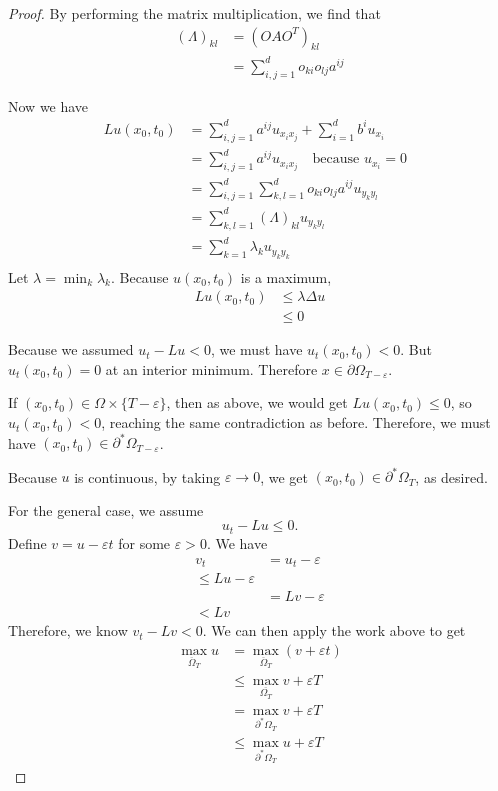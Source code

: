 \documentclass[a4paper]{article}
\begin{document}
\begin{enumerate}
\begin{proof}
     By performing the matrix multiplication, we find that
     \begin{align*}
       (\Lambda)_{kl} &= (OAO^T)_{kl} \\
       &= \sum_{i,j=1}^d o_{ki} o_{lj} a^{ij}
     \end{align*}

     Now we have
     \begin{align*}
       Lu(x_0,t_0) &= \sum_{i,j=1}^d a^{ij} u_{x_i x_j} + \sum_{i=1}^d b^i u_{x_i} \\
       &= \sum_{i,j=1}^d a^{ij} u_{x_i x_j} \quad \text{because $u_{x_i}=0$ } \\
       &= \sum_{i,j=1}^d \sum_{k,l=1}^d o_{ki} o_{lj} a^{ij} u_{y_k y_l} \\
       &= \sum_{k,l=1}^d (\Lambda)_{kl} u_{y_k y_l} \\
       &= \sum_{k=1}^d \lambda_k u_{y_k y_k} \\
     \end{align*}
    Let $\lambda = \min_{k} \lambda_k$.
    Because $u(x_0,t_0)$ is a maximum,
    \begin{align*}
      Lu(x_0,t_0) &\leq \lambda \Delta u \\
      &\leq 0
    \end{align*}

    Because we assumed $u_t - Lu < 0$, we must have $u_t(x_0, t_0) < 0$. But $u_t(x_0,t_0) = 0$ at an interior minimum. Therefore $x \in
    \partial \Omega_{T-\varepsilon}$.

    If $(x_0, t_0) \in \Omega \times \{T-\varepsilon\}$, then as above, we would get $Lu(x_0,t_0) \leq 0$, so $u_t(x_0, t_0) < 0$, reaching the same
    contradiction as before.
    Therefore, we must have $(x_0,t_0) \in \partial^\ast \Omega_{T-\varepsilon}$.

    Because $u$ is continuous, by taking $\varepsilon \to 0$, we get $(x_0, t_0) \in \partial^\ast \Omega_T$, as desired.

    For the general case, we assume
    \[ u_t - Lu \leq 0 .\]
    Define $v = u - \varepsilon t$ for some $\varepsilon >0$. We have
    \begin{align*}
      v_t &= u_t - \varepsilon \\
      \leq Lu - \varepsilon \\
      &= Lv - \varepsilon \\
      < Lv
    \end{align*}
    Therefore, we know $v_t - Lv < 0$. We can then apply the work above to get
    \begin{align*}
      \max_{ \overline{\Omega}_T } u &= \max_{ \overline{\Omega}_T } (v + \varepsilon t) \\
      &\leq \max_{ \overline{\Omega_T} } v + \varepsilon T \\
      &= \max_{\partial^\ast \Omega_T} v + \varepsilon T \\
      &\leq \max_{\partial^\ast \Omega_T} u + \varepsilon T
    \end{align*}


\end{proof}
\end{enumerate}
\end{document}
